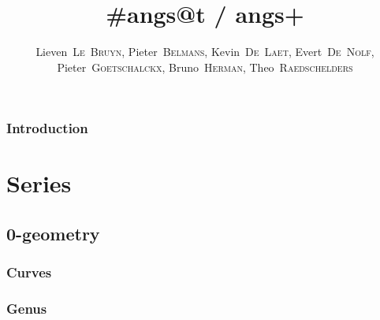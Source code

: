 \documentclass[a4paper]{memoir}
\begin{document}
\title{\#angs@t / angs+}
\author{
  Lieven~\textsc{Le~Bruyn}, Pieter~\textsc{Belmans}, Kevin~\textsc{De~Laet}, Evert~\textsc{De~Nolf}, Pieter~\textsc{Goetschalckx}, Bruno~\textsc{Herman}, Theo~\textsc{Raedschelders}
}


\tableofcontents*

\clearpage

\section*{Introduction}

\part{Series}

\chapter{0-geometry}
\section{Curves}
\section{Genus}
\end{document}
